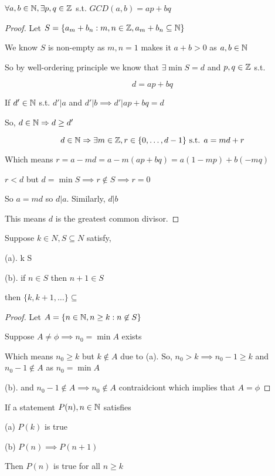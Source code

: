 \begin{theorem}
    $\forall a,b \in \mathbb{N}, \exists p,q \in \mathbb{Z}$ s.t.  $GCD(a,b) = ap + bq$
\end{theorem}
\begin{proof}
    Let $S = \{a_m + b_n : m,n \in \mathbb{Z}, a_m + b_n \subseteq \mathbb{N}\}$

    We know $S$ is non-empty as $m,n = 1$ makes it  $a + b > 0$ as  $a,b \in \mathbb{N}$

    So by well-ordering principle we know that $\exists \min S = d$ and $p,q \in \mathbb{Z}$ s.t.
     
    $$ d = ap + bq $$ 

    If $d' \in \mathbb{N}$ s.t.  $d' | a$ and  $d' | b \implies d' | ap + bq = d$

    So, $d \in \mathbb{N} \Rightarrow d \ge d'$

    $$d \in \mathbb{N} \Rightarrow \exists m \in \mathbb{Z}, r \in \{0,\dots,d - 1\} \text{ s.t. } a = md + r$$

    Which means $r = a - md = a - m(ap + bq) = a (1 - mp) +  b(-mq)$

    $r < d$ but $d = \min S \implies r \not \in S \implies r = 0$

    So  $a = md$ so  $d | a$. Similarly, $d | b$

    This means $d$ is the greatest common divisor.
\end{proof}


\begin{theorem}
    Suppose $ k \in N, S \subseteq N$ satisfy, 
    
    (a). k \in S

    (b). if  $ n \in S$ then  $ n + 1 \in S$

    then $\{k,k+1,\dots\} \subseteq$

\end{theorem}
\begin{proof}
    Let $A = \{n \in \mathbb{N}, n \ge k: n \not \in S\}$

    Suppose $A \ne \phi \implies n_0 = \min A$ exists

    Which means $ n_0 \ge k$ but $k \not \in A$ due to (a). So, $n_0 > k \implies n_0 - 1 \ge k$ and $n_0 - 1 \not \in A$ as $n_0 = \min A$

    (b). and $n_0 - 1 \not \in A \implies n_0 \not \in A$ contraidciont which implies that $A = \phi$

\end{proof}

\begin{corollary}
    If a statement $P(n), n \in \mathbb{N}$ satisfies 

    (a)  $P(k)$ is true

    (b) $P(n) \implies P(n + 1)$

    Then $P(n)$ is true for all  $n \ge k$
    
\end{corollary}
